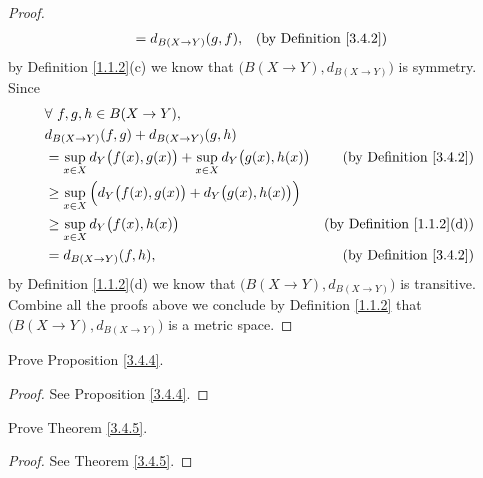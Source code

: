 \begin{proof}
\begin{align*}
                                                           & = d_{B(X \to Y)}(g, f),                  & \text{(by Definition \ref{3.4.2})}
    \end{align*}
    by Definition \ref{1.1.2}(c) we know that \(\big(B(X \to Y), d_{B(X \to Y)}\big)\) is symmetry.
    Since
    \begin{align*}
         & \forall\ f, g, h \in B(X \to Y),                                                                                          \\
         & d_{B(X \to Y)}(f, g) + d_{B(X \to Y)}(g, h)                                                                               \\
         & = \sup_{x \in X} d_Y\big(f(x), g(x)\big) + \sup_{x \in X} d_Y\big(g(x), h(x)\big) & \text{(by Definition \ref{3.4.2})}    \\
         & \geq \sup_{x \in X} \Big(d_Y\big(f(x), g(x)\big) + d_Y\big(g(x), h(x)\big)\Big)                                           \\
         & \geq \sup_{x \in X} d_Y\big(f(x), h(x)\big)                                       & \text{(by Definition \ref{1.1.2}(d))} \\
         & = d_{B(X \to Y)}(f, h),                                                           & \text{(by Definition \ref{3.4.2})}
    \end{align*}
    by Definition \ref{1.1.2}(d) we know that \(\big(B(X \to Y), d_{B(X \to Y)}\big)\) is transitive.
    Combine all the proofs above we conclude by Definition \ref{1.1.2} that \(\big(B(X \to Y), d_{B(X \to Y)}\big)\) is a metric space.
\end{proof}

\begin{exercise}\label{ex 3.4.2}
    Prove Proposition \ref{3.4.4}.
\end{exercise}

\begin{proof}
    See Proposition \ref{3.4.4}.
\end{proof}

\begin{exercise}\label{ex 3.4.3}
    Prove Theorem \ref{3.4.5}.
\end{exercise}

\begin{proof}
    See Theorem \ref{3.4.5}.
\end{proof}

